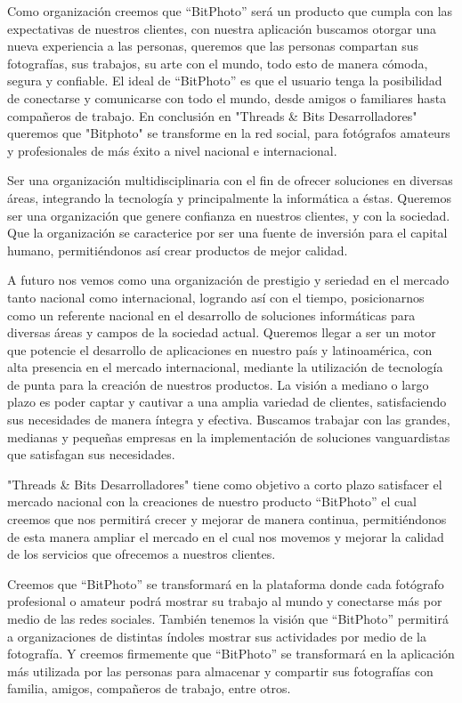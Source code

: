 \documentclass{memoria}
\begin{document}
Como organización creemos que “BitPhoto” será un producto que cumpla con las expectativas de nuestros clientes, con nuestra aplicación buscamos otorgar una nueva experiencia a las personas, queremos que las personas compartan sus fotografías, sus trabajos, su arte con el mundo, todo esto de manera cómoda, segura y confiable. El ideal de “BitPhoto” es que el usuario tenga la posibilidad de conectarse y comunicarse con todo el mundo, desde amigos o familiares hasta compañeros de trabajo. En conclusión en "Threads \& Bits Desarrolladores" queremos que "Bitphoto" se transforme en la red social, para fotógrafos amateurs y profesionales de más éxito a nivel nacional e internacional.\\



Ser una organización multidisciplinaria con el fin de ofrecer soluciones en diversas áreas, integrando la tecnología y principalmente la informática a éstas. Queremos ser una organización que genere confianza en nuestros clientes, y con la sociedad. Que la organización se caracterice por ser una fuente de inversión para el capital humano, permitiéndonos así crear productos de mejor calidad.

A futuro nos vemos como una organización de prestigio y seriedad en el mercado tanto nacional como internacional, logrando así con el tiempo, posicionarnos como un referente nacional en el desarrollo de soluciones informáticas para diversas áreas y campos de la sociedad actual. Queremos llegar a ser un motor que potencie el desarrollo de aplicaciones en nuestro país y latinoamérica, con alta presencia en el mercado internacional, mediante la utilización de tecnología de punta para la creación de nuestros productos. La visión a mediano o largo plazo es poder captar y cautivar a una amplia variedad de clientes, satisfaciendo sus necesidades de manera íntegra y efectiva. Buscamos trabajar con las grandes, medianas y pequeñas empresas en la implementación de soluciones vanguardistas que satisfagan sus necesidades.

"Threads \& Bits Desarrolladores" tiene como objetivo a corto plazo satisfacer el mercado nacional con la creaciones de nuestro producto “BitPhoto” el cual creemos que nos permitirá crecer y mejorar de manera continua, permitiéndonos de esta manera ampliar el mercado en el cual nos movemos  y mejorar la calidad de los servicios que ofrecemos a nuestros clientes.

Creemos que “BitPhoto” se transformará en la plataforma donde cada fotógrafo profesional o amateur podrá mostrar su trabajo al mundo y conectarse más por medio de las redes sociales.  También tenemos la visión que “BitPhoto” permitirá a organizaciones de distintas índoles mostrar sus actividades por medio de la fotografía. Y creemos firmemente que “BitPhoto” se transformará en la aplicación más utilizada por las personas para almacenar y compartir sus fotografías con familia, amigos, compañeros de trabajo, entre otros.
\end{document}
